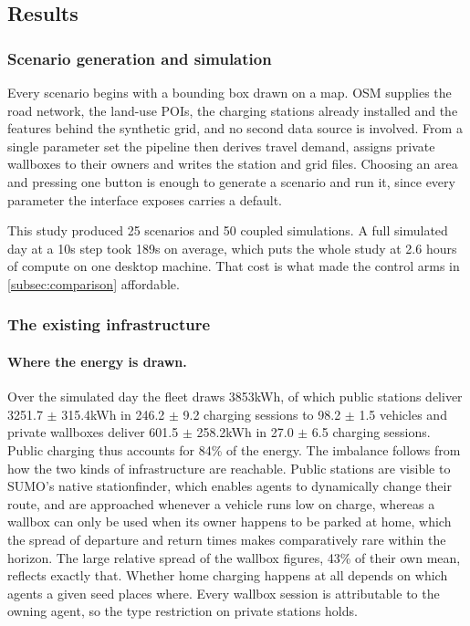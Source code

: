 \subsection{Results}
\label{subsec:results}

\subsubsection{Scenario generation and simulation}

Every scenario begins with a bounding box drawn on a map. \ac{OSM} supplies the road network, the land-use \acp{POI}, the charging stations already installed and the features behind the synthetic grid, and no second data source is involved. From a single parameter set the pipeline then derives travel demand, assigns private wallboxes to their owners and writes the station and grid files. Choosing an area and pressing one button is enough to generate a scenario and run it, since every parameter the interface exposes carries a default.

This study produced 25 scenarios and 50 coupled simulations. A full simulated day at a 10s step took 189s on average, which puts the whole study at 2.6 hours of compute on one desktop machine. That cost is what made the control arms in \cref{subsec:comparison} affordable.

\subsubsection{The existing infrastructure}

\paragraph{Where the energy is drawn.} Over the simulated day the fleet draws 3853kWh, of which public stations deliver 3251.7 $\pm$ 315.4kWh in 246.2 $\pm$ 9.2 charging sessions to 98.2 $\pm$ 1.5 vehicles and private wallboxes deliver 601.5 $\pm$ 258.2kWh in 27.0 $\pm$ 6.5 charging sessions. Public charging thus accounts for 84\% of the energy. The imbalance follows from how the two kinds of infrastructure are reachable. Public stations are visible to \ac{SUMO}'s native stationfinder, which enables agents to dynamically change their route, and are approached whenever a vehicle runs low on charge, whereas a wallbox can only be used when its owner happens to be parked at home, which the spread of departure and return times makes comparatively rare within the horizon. The large relative spread of the wallbox figures, 43\% of their own mean, reflects exactly that. Whether home charging happens at all depends on which agents a given seed places where. Every wallbox session is attributable to the owning agent, so the type restriction on private stations holds.

